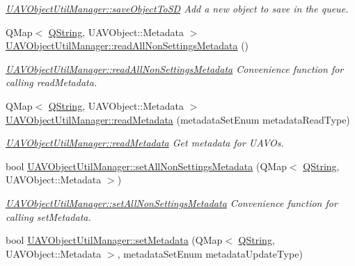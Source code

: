 \begin{DoxyCompactItemize}
\begin{DoxyCompactList}\small\item\em \hyperlink{group___u_a_v_object_util_plugin_ga007cecfcbf4a9d18c1f2c9ec13de4222}{\-U\-A\-V\-Object\-Util\-Manager\-::save\-Object\-To\-S\-D} \-Add a new object to save in the queue. \end{DoxyCompactList}\item 
\-Q\-Map$<$ \hyperlink{group___u_a_v_objects_plugin_gab9d252f49c333c94a72f97ce3105a32d}{\-Q\-String}, \*
\-U\-A\-V\-Object\-::\-Metadata $>$ \hyperlink{group___u_a_v_object_util_plugin_ga1bc82b9cb256ba0c3974bab7489aba4a}{\-U\-A\-V\-Object\-Util\-Manager\-::read\-All\-Non\-Settings\-Metadata} ()
\begin{DoxyCompactList}\small\item\em \hyperlink{group___u_a_v_object_util_plugin_ga1bc82b9cb256ba0c3974bab7489aba4a}{\-U\-A\-V\-Object\-Util\-Manager\-::read\-All\-Non\-Settings\-Metadata} \-Convenience function for calling read\-Metadata. \end{DoxyCompactList}\item 
\-Q\-Map$<$ \hyperlink{group___u_a_v_objects_plugin_gab9d252f49c333c94a72f97ce3105a32d}{\-Q\-String}, \*
\-U\-A\-V\-Object\-::\-Metadata $>$ \hyperlink{group___u_a_v_object_util_plugin_gac4fbb0efd0a309169dea095945710ed3}{\-U\-A\-V\-Object\-Util\-Manager\-::read\-Metadata} (metadata\-Set\-Enum metadata\-Read\-Type)
\begin{DoxyCompactList}\small\item\em \hyperlink{group___u_a_v_object_util_plugin_gac4fbb0efd0a309169dea095945710ed3}{\-U\-A\-V\-Object\-Util\-Manager\-::read\-Metadata} \-Get metadata for \-U\-A\-V\-Os. \end{DoxyCompactList}\item 
bool \hyperlink{group___u_a_v_object_util_plugin_gaaa6258eb268dae068887432d5efcfa6c}{\-U\-A\-V\-Object\-Util\-Manager\-::set\-All\-Non\-Settings\-Metadata} (\-Q\-Map$<$ \hyperlink{group___u_a_v_objects_plugin_gab9d252f49c333c94a72f97ce3105a32d}{\-Q\-String}, \-U\-A\-V\-Object\-::\-Metadata $>$)
\begin{DoxyCompactList}\small\item\em \hyperlink{group___u_a_v_object_util_plugin_gaaa6258eb268dae068887432d5efcfa6c}{\-U\-A\-V\-Object\-Util\-Manager\-::set\-All\-Non\-Settings\-Metadata} \-Convenience function for calling set\-Metadata. \end{DoxyCompactList}\item 
bool \hyperlink{group___u_a_v_object_util_plugin_gab813cc6401727303f0787527bbd29ad1}{\-U\-A\-V\-Object\-Util\-Manager\-::set\-Metadata} (\-Q\-Map$<$ \hyperlink{group___u_a_v_objects_plugin_gab9d252f49c333c94a72f97ce3105a32d}{\-Q\-String}, \-U\-A\-V\-Object\-::\-Metadata $>$, metadata\-Set\-Enum metadata\-Update\-Type)

\end{DoxyCompactItemize}
